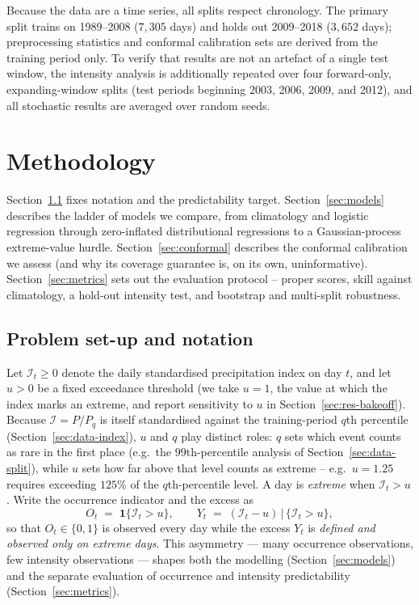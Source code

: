 \documentclass[11pt,a4paper]{article}
\newcommand{\Ind}{\mathcal{I}}                 %
\begin{document}
Because the data are a time series, all splits respect chronology. The primary
split trains on 1989--2008 ($7{,}305$ days) and holds out 2009--2018 ($3{,}652$
days); preprocessing statistics and conformal calibration sets are derived from
the training period only. To verify that results are not an artefact of a single
test window, the intensity analysis is additionally repeated over four
forward-only, expanding-window splits (test periods beginning 2003, 2006, 2009,
and 2012), and all stochastic results are averaged over random seeds.

\section{Methodology}\label{sec:method}

Section~\ref{sec:setup} fixes notation and the predictability target.
Section~\ref{sec:models} describes the ladder of models we compare, from
climatology and logistic regression through zero-inflated distributional
regressions to a Gaussian-process extreme-value hurdle.
Section~\ref{sec:conformal} describes the conformal calibration we assess (and
why its coverage guarantee is, on its own, uninformative).
Section~\ref{sec:metrics} sets out the evaluation protocol -- proper scores,
skill against climatology, a hold-out intensity test, and bootstrap and
multi-split robustness.

\subsection{Problem set-up and notation}\label{sec:setup}
Let $\Ind_t \ge 0$ denote the daily standardised precipitation index on day
$t$, and let $u>0$ be a fixed exceedance threshold (we take $u=1$, the value at
which the index marks an extreme, and report sensitivity to $u$ in
Section~\ref{sec:res-bakeoff}). Because $\Ind=P/P_q$ is itself standardised against the training-period
$q$th percentile (Section~\ref{sec:data-index}), $u$ and $q$ play distinct
roles: $q$ sets which event counts as rare in the first place (e.g.\ the
$99$th-percentile analysis of Section~\ref{sec:data-split}), while $u$ sets
how far above that level counts as extreme -- e.g.\ $u=1.25$ requires
exceeding $125\%$ of the $q$th-percentile level. A day
is
\emph{extreme} when $\Ind_t > u$. Write the occurrence indicator and the excess
as
\begin{equation}
O_t \;=\; \mathbf{1}\{\Ind_t > u\},
\qquad
Y_t \;=\; (\Ind_t - u)\,\big|\,\{\Ind_t > u\},
\end{equation}
so that $O_t\in\{0,1\}$ is observed every day while the excess $Y_t$ is
\emph{defined and observed only on extreme days}. This asymmetry --- many
occurrence observations, few intensity observations --- shapes both the modelling
(Section~\ref{sec:models}) and the separate evaluation of occurrence and
intensity predictability (Section~\ref{sec:metrics}).
\end{document}
